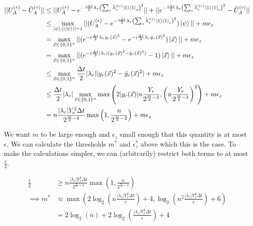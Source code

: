 \begin{equation}
    \begin{split}
        ||U_A^{(r)} - \tilde{U}_A^{(r)}|| &\leq ||U_A^{(r)} - e^{-\frac{i\Delta t}{2}\lambda_r\left(\sum_s \tilde{\lambda}'^{(r)}_s \ket{1}\bra{1}_s\right)^2}|| + ||e^{-\frac{i\Delta t}{2}\lambda_r\left(\sum_s \tilde{\lambda}'^{(r)}_s \ket{1}\bra{1}_s\right)^2} - \tilde{U}_A^{(r)}|| \\
        &\leq \max_{\ket{\psi} : ||\ket{\psi}|| = 1} ||(U_A^{(r)} - e^{-\frac{i\Delta t}{2}\lambda_r\left(\sum_s \tilde{\lambda}'^{(r)}_s \ket{1}\bra{1}_s\right)^2})\ket{\psi}|| + m\epsilon_z \\
        &= \max_{\vec{x} \in \{0, 1\}^n} ||(e^{-i\frac{\Delta t}{2}\lambda_ry_r(\vec{x})^2} - e^{-i\frac{\Delta t}{2}\lambda_r\tilde{y}_r(\vec{x})^2})\ket{\vec{x}}|| + m\epsilon_z \\
        &= \max_{\vec{x} \in \{0, 1\}^n} ||(e^{-i\frac{\Delta t}{2}|\lambda_r|(y_r(\vec{x})^2 - \tilde{y}_r(\vec{x})^2)} - 1)\ket{\vec{x}}|| + m\epsilon_z \\
        &\leq \max_{\vec{x} \in \{0, 1\}^n} \frac{\Delta t}{2}|\lambda_r||y_r(\vec{x})^2 - \tilde{y}_r(\vec{x})^2| + m\epsilon_z \\
        &\leq \frac{\Delta t}{2}|\lambda_r|\max_{\vec{x} \in \{0, 1\}^n} \max\left(2|y_r(\vec{x})|n\frac{Y_r}{2^{\frac{m}{2} - 3}}, \left(n\frac{Y_r}{2^{\frac{m}{2} - 3}}\right)^2\right) + m\epsilon_z \\
        &= n\frac{|\lambda_r| Y_r^2\Delta t}{2^{\frac{m}{2} - 4}}\max\left(1, \frac{n}{2^{\frac{m}{2} - 2}}\right) + m\epsilon_z
    \end{split}
\end{equation}

We want $m$ to be large enough and $\epsilon_z$ small enough that this quantity is at most $\epsilon$. We can calculate the thresholds $m^*$ and $\epsilon_z^*$ above which this is the case. To make the calculations simpler, we can (arbitrarily) restrict both terms to at most $\frac{\epsilon}{2}$.

\begin{equation}
    \begin{split}
        \frac{\epsilon}{2} &\geq n\frac{|\lambda_r| Y_r^2\Delta t}{2^{\frac{m}{2} - 4}}\max\left(1, \frac{n}{2^{\frac{m}{2} - 2}}\right) \\
        \implies m^* &\approx \max(2\log_2\left(n\frac{|\lambda_r|Y_r^2\Delta t}{\epsilon}\right) + 4, \log_2\left(n^2\frac{|\lambda_r|Y_r^2\Delta t}{\epsilon}\right) + 6) \\
        &= 2\log_2(n) + 2\log_2\left(\frac{|\lambda_r|Y_r^2\Delta t}{\epsilon}\right) + 4 \label{eq: m_min}
    \end{split}
\end{equation}

